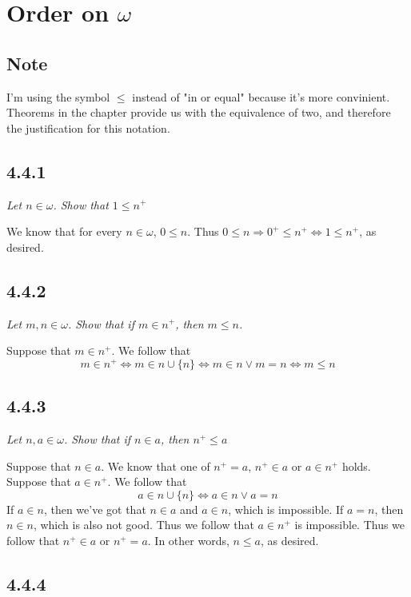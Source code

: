 \documentclass[11pt,oneside,titlepage]{book}
\DeclareMathOperator \lra {\Leftrightarrow}
\DeclareMathOperator \ra {\Rightarrow}
\begin{document}
\section{Order on $\omega$}

\subsection*{Note}

I'm using the symbol $\leq$ instead of "in or equal" because it's more convinient.
Theorems in the chapter provide us with the equivalence of two, and therefore the justification
for this notation.

\subsection*{4.4.1}

\textit{Let $n \in \omega$. Show that $1 \leq n^+$}

We know that for every $n \in \omega$, $0 \leq n$.
Thus $0 \leq n \ra 0^+ \leq n^+ \lra 1 \leq n^+$, as desired.

\subsection*{4.4.2}

\textit{Let $m, n \in \omega$. Show that if $m \in n^+$, then $m \leq n$.}

Suppose that $m \in n^+$. We follow that
$$m \in n^+ \lra m \in n \cup \{n\} \lra m \in n \lor m = n \lra m \leq n$$


\subsection*{4.4.3}

\textit{Let $n, a \in \omega$. Show that if $n \in a$, then $n^+ \leq a$}

Suppose that $n \in a$. We know that one of  $n^+ = a$, $n^+ \in a$ or $a \in n^+$ holds.
Suppose that $a \in n^+$. We follow that
$$a \in n \cup \{n\} \lra a \in n \lor a = n$$
If $a \in n$, then we've got that $n \in a$ and $a \in n$, which is impossible. If $a = n$,
then $n \in n$, which is also not good. Thus we follow that $a \in n^+$ is impossible.
Thus we follow that $n^+ \in a$ or $n^+ = a$. In other words, $n \leq a$, as desired.


\subsection*{4.4.4}
\end{document}
